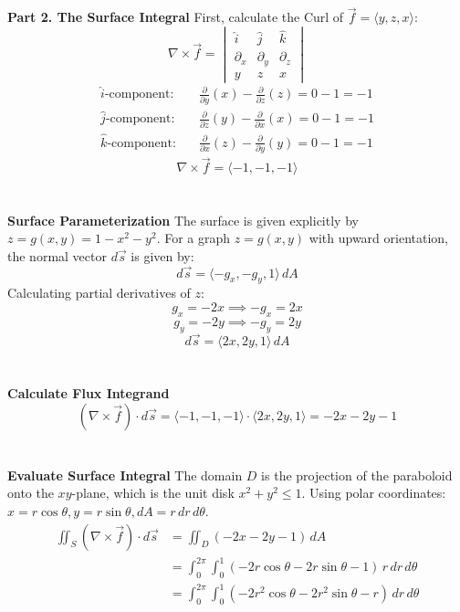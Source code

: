 \documentclass{article}
\begin{document}
\\
\\
\textbf{Part 2. The Surface Integral}
First, calculate the Curl of $\vec{f} = \langle y, z, x \rangle$:
\[
	\nabla \times \vec{f} = \begin{vmatrix} \hat{i} & \hat{j} & \hat{k} \\ \partial_x & \partial_y & \partial_z \\ y & z & x \end{vmatrix}
\]
\begin{align*}
	\text{$\hat{i}$-component:} & \quad \frac{\partial}{\partial y}(x) - \frac{\partial}{\partial z}(z) = 0 - 1 = -1 \\
	\text{$\hat{j}$-component:} & \quad \frac{\partial}{\partial z}(y) - \frac{\partial}{\partial x}(x) = 0 - 1 = -1 \\
	\text{$\hat{k}$-component:} & \quad \frac{\partial}{\partial x}(z) - \frac{\partial}{\partial y}(y) = 0 - 1 = -1
\end{align*}
\[
	\nabla \times \vec{f} = \langle -1, -1, -1 \rangle
\]
\\
\\
\textbf{Surface Parameterization}
The surface is given explicitly by $z = g(x,y) = 1 - x^2 - y^2$.
For a graph $z=g(x,y)$ with upward orientation, the normal vector $d\vec{s}$ is
given by:
\[
	d\vec{s} = \langle -g_x, -g_y, 1 \rangle \, dA
\]
Calculating partial derivatives of $z$:
\[
	g_x = -2x \implies -g_x = 2x
\]
\[
	g_y = -2y \implies -g_y = 2y
\]
\[
	d\vec{s} = \langle 2x, 2y, 1 \rangle \, dA
\]
\\
\\
\textbf{Calculate Flux Integrand}
\[
	(\nabla \times \vec{f}) \cdot d\vec{s} = \langle -1, -1, -1 \rangle \cdot \langle 2x, 2y, 1 \rangle = -2x - 2y - 1
\]
\\
\\
\textbf{Evaluate Surface Integral}
The domain $D$ is the projection of the paraboloid onto the $xy$-plane, which is
the unit disk $x^2 + y^2 \le 1$. Using polar coordinates:
$x = r\cos\theta, y = r\sin\theta, dA = r \, dr \, d\theta$.
\begin{align*}
	\iint_S (\nabla \times \vec{f}) \cdot d\vec{s} & = \iint_D (-2x - 2y - 1) \, dA                                                    \\
	                                               & = \int_0^{2\pi} \int_0^1 (-2r\cos\theta - 2r\sin\theta - 1) \, r \, dr \, d\theta \\
	                                               & = \int_0^{2\pi} \int_0^1 (-2r^2\cos\theta - 2r^2\sin\theta - r) \, dr \, d\theta
\end{align*}
\end{document}
